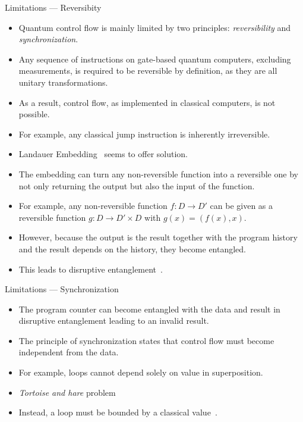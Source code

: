 \begin{frame}{Limitations --- Reversibity}
    \begin{itemize}
        \item Quantum control flow is mainly limited by two principles: \emph{reversibility} and \emph{synchronization}.
        \item Any sequence of instructions on gate-based quantum computers, excluding measurements, is required to be reversible by definition, as they are all unitary transformations.
        \item As a result, control flow, as implemented in classical computers, is not possible.
        \item For example, any classical jump instruction is inherently irreversible.
        \item Landauer Embedding~\cite{Land61} seems to offer solution.
        \item The embedding can turn any non-reversible function into a reversible one by not only returning the output but also the input of the function.
        \item For example, any non-reversible function $f : D \to D'$ can be given as a reversible function $g : D \to D' \times D$ with $g(x) = (f(x), x)$.
        \item However, because the output is the result together with the program history and the result depends on the history, they become entangled.
        \item This leads to disruptive entanglement~\cite{YVC24}.
    \end{itemize}
\end{frame}

\begin{frame}{Limitations --- Synchronization}
    \begin{itemize}
        \item The program counter can become entangled with the data and result in disruptive entanglement leading to an invalid result.
        \item The principle of synchronization states that control flow must become independent from the data.
        \item For example, loops cannot depend solely on value in superposition.
        \item \emph{Tortoise and hare} problem
        \item Instead, a loop must be bounded by a classical value~\cite{YVC24}. 
    \end{itemize}
\end{frame}

